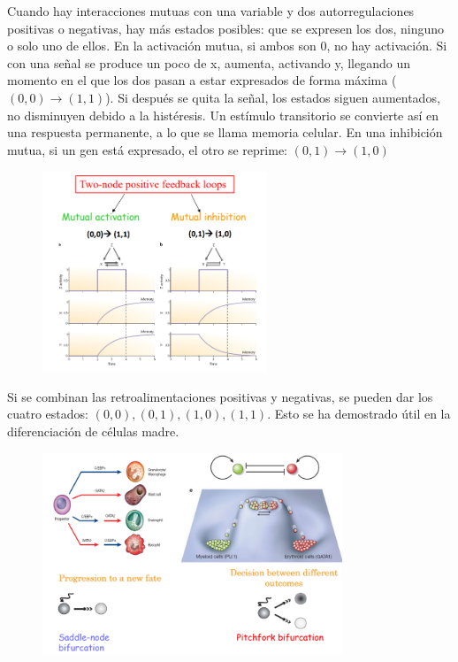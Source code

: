 Cuando hay interacciones mutuas con una variable y dos autorregulaciones positivas o negativas, hay más estados posibles: que se expresen los dos, ninguno o solo uno de ellos. En la activación mutua, si ambos son 0, no hay activación. Si con una señal se produce un poco de x, aumenta, activando y, llegando un momento en el que los dos pasan a estar expresados de forma máxima ($(0,0) \rightarrow (1,1)$). Si después se quita la señal, los estados siguen aumentados, no disminuyen debido a la histéresis. Un estímulo transitorio se convierte así en una respuesta permanente, a lo que se llama memoria celular. En una inhibición mutua, si un gen está expresado, el otro se reprime: $(0,1) \rightarrow (1,0)$
\begin{figure}[h]
\centering
\includegraphics[width = 0.6\textwidth]{figs/cellular-memory.png}
\end{figure}

Si se combinan las retroalimentaciones positivas y negativas, se pueden dar los cuatro estados: $(0,0), (0,1), (1,0), (1,1)$. Esto se ha demostrado útil en la diferenciación de células madre.

\begin{figure}[h]
\centering
\includegraphics[width = 0.8\textwidth]{figs/stem-differentiation.png}
\end{figure}


